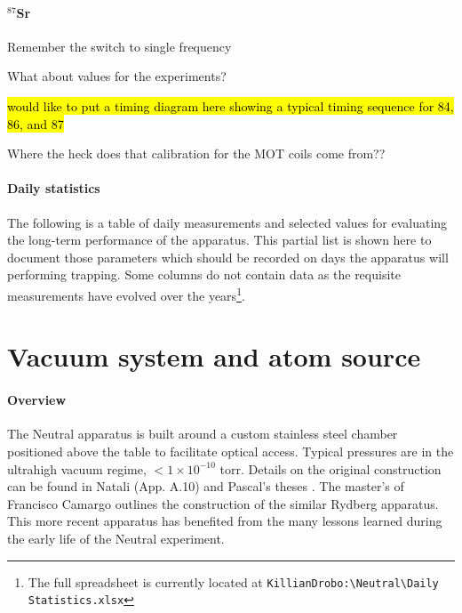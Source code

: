 \paragraph{$^{87}$Sr} \label{sec:87_trapping}


Remember the switch to single frequency

What about values for the experiments?

\hl{would like to put a timing diagram here showing a typical timing sequence for 84, 86, and 87}

Where the heck does that calibration for the MOT coils come from??

\paragraph{Daily statistics} \label{sec:dailyStats}
The following is a table of daily measurements and selected values for evaluating the long-term performance of the apparatus.
This partial list is shown here to document those parameters which should be recorded on days the apparatus will performing trapping.
Some columns do not contain data as the requisite measurements have evolved over the years\footnote{The full spreadsheet is currently located at \texttt{KillianDrobo:\textbackslash Neutral\textbackslash Daily Statistics.xlsx}}.

\section{Vacuum system and atom source} \label{sec:vac}

\paragraph{Overview}
	
The Neutral apparatus is built around a custom stainless steel chamber positioned above the table to facilitate optical access. Typical pressures are in the ultrahigh vacuum regime, $<1\times10^{-10}$ torr. 
Details on the original construction can be found in Natali (App. A.10) and Pascal's theses \cite{MartinezdeEscolar2010,Mickelson2010b}. The master's of Francisco Camargo \cite{Camargo2015} outlines the construction of the similar Rydberg apparatus. This more recent apparatus has benefited from the many lessons learned during the early life of the Neutral experiment.
\newline

